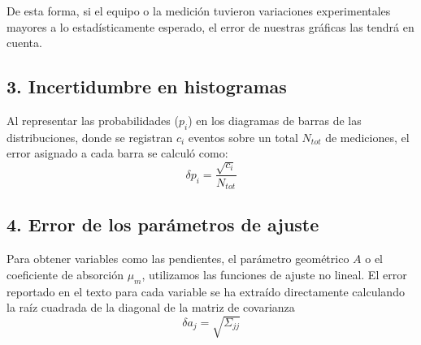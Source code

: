 \documentclass[9pt,a4paper,twocolumn,twoside]{rho-class/rho}
\begin{document}
De esta forma, si el equipo o la medición tuvieron variaciones experimentales mayores a lo estadísticamente esperado, el error de nuestras gráficas las tendrá en cuenta.

\subsection*{3. Incertidumbre en histogramas}
Al representar las probabilidades ($p_i$) en los diagramas de barras de las distribuciones, donde se registran $c_i$ eventos sobre un total $N_{tot}$ de mediciones, el error asignado a cada barra se calculó como:
\vspace{0.2cm}
\begin{equation*}
    \delta p_i = \frac{\sqrt{c_i}}{N_{tot}}
\end{equation*}

\subsection*{4. Error de los parámetros de ajuste}
Para obtener variables como las pendientes, el parámetro geométrico $A$ o el coeficiente de absorción $\mu_m$, utilizamos las funciones de ajuste no lineal. El error reportado en el texto para cada variable se ha extraído directamente calculando la raíz cuadrada de la diagonal de la matriz de covarianza
\vspace{0.2cm}
\begin{equation*}
    \delta a_j = \sqrt{\Sigma_{jj}}
\end{equation*}
\end{document}
